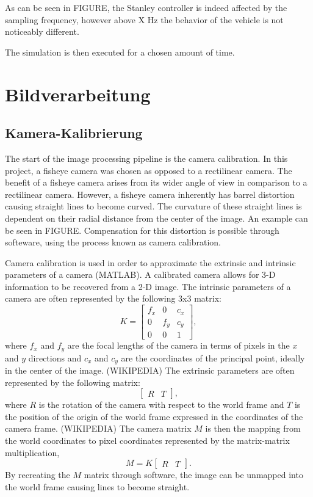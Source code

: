 \documentclass[arbeit=studie,oneside,BCOR=12mm]{ArbeitRST}
\begin{document}
As can be seen in FIGURE, the Stanley controller is indeed affected by the
sampling frequency, however above X Hz the behavior of the vehicle is not
noticeably different. 

The simulation is then executed for a chosen amount of time. 

\chapter{Bildverarbeitung} 

\section{Kamera-Kalibrierung} 

The start of the image processing pipeline is the camera calibration. In this
project, a fisheye camera was chosen as opposed to a rectilinear camera. The
benefit of a fisheye camera arises from its wider angle of view in comparison
to a rectilinear camera. However, a fisheye camera inherently has barrel
distortion causing straight lines to become curved. The curvature of these
straight lines is dependent on their radial distance from the center of the
image. An example can be seen in FIGURE. Compensation for this distortion is
possible through softeware, using the process known as camera calibration. 

Camera calibration is used in order to approximate the extrinsic and intrinsic
parameters of a camera (MATLAB). A calibrated camera allows for 3-D information
to be recovered from a 2-D image. The intrinsic parameters of a camera are
often represented by the following 3x3 matrix:
\begin{equation}
  K = 
  \begin{bmatrix} 
    f_x & 0 & c_x\\ 
    0 & f_y & c_y\\
    0 & 0 & 1 
  \end{bmatrix},
\end{equation}
where $f_x$ and $f_y$ are the focal lengths of the camera in terms of pixels in
the $x$ and $y$ directions and $c_x$ and $c_y$ are the coordinates of the
principal point, ideally in the center of the image. (WIKIPEDIA) The extrinsic
parameters are often represented by the following matrix: 
\begin{equation}
  \begin{bmatrix}
    R & T
  \end{bmatrix},
\end{equation}
where $R$ is the rotation of the camera with respect to the world frame and $T$
is the position of the origin of the world frame expressed in the coordinates
of the camera frame. (WIKIPEDIA) The camera matrix $M$ is then the mapping from
the world coordinates to pixel coordinates represented by the matrix-matrix 
multiplication,
\begin{equation}
  M = K 
  \begin{bmatrix}
    R & T
  \end{bmatrix}.
\end{equation}
By recreating the $M$ matrix through software, the image can be unmapped into
the world frame causing lines to become straight.
\end{document}
